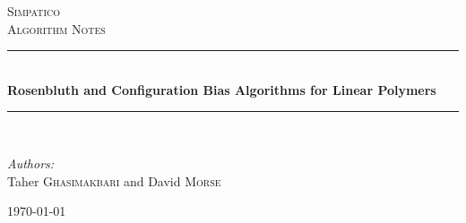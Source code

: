 \documentclass[12pt]{article}
\begin{document}

\begin{titlepage}

\newcommand{\HRule}{\rule{\linewidth}{0.5mm}} 

\center %

\textsc{\Large Simpatico}\\[0.5cm] %
\textsc{\large Algorithm Notes}\\[0.5cm] %

\HRule \\[0.4cm]
{ \huge \bfseries Rosenbluth and Configuration Bias Algorithms for Linear Polymers}\\[0.4cm] %
\HRule \\[1.5cm]

\begin{flushleft} \large
\emph{Authors:}\\
Taher \textsc{Ghasimakbari} and David \textsc{Morse} 
\end{flushleft}

{\large \today}\\[3cm] 

\vfill %

\end{titlepage}




\end{document}
